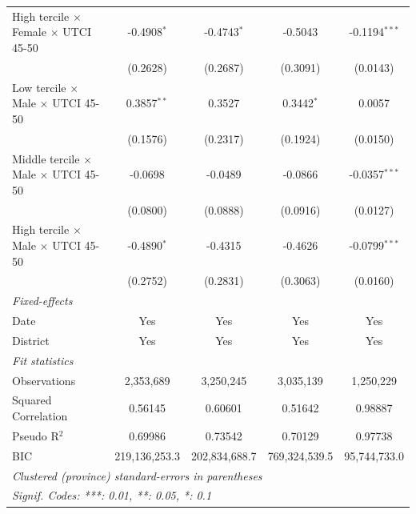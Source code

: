 \begin{table}[htbp]
\begin{tabular}{lcccc}
      High tercile $\times$ Female $\times$ UTCI 45-50     & -0.4908$^{*}$   & -0.4743$^{*}$       & -0.5043           & -0.1194$^{***}$\\   
                                                           & (0.2628)        & (0.2687)            & (0.3091)          & (0.0143)\\   
      Low tercile $\times$ Male $\times$ UTCI 45-50        & 0.3857$^{**}$   & 0.3527              & 0.3442$^{*}$      & 0.0057\\   
                                                           & (0.1576)        & (0.2317)            & (0.1924)          & (0.0150)\\   
      Middle tercile $\times$ Male $\times$ UTCI 45-50     & -0.0698         & -0.0489             & -0.0866           & -0.0357$^{***}$\\   
                                                           & (0.0800)        & (0.0888)            & (0.0916)          & (0.0127)\\   
      High tercile $\times$ Male $\times$ UTCI 45-50       & -0.4890$^{*}$   & -0.4315             & -0.4626           & -0.0799$^{***}$\\   
                                                           & (0.2752)        & (0.2831)            & (0.3063)          & (0.0160)\\   
      \midrule
      \emph{Fixed-effects}\\
      Date                                                 & Yes             & Yes                 & Yes               & Yes\\  
      District                                             & Yes             & Yes                 & Yes               & Yes\\  
      \midrule
      \emph{Fit statistics}\\
      Observations                                         & 2,353,689       & 3,250,245           & 3,035,139         & 1,250,229\\  
      Squared Correlation                                  & 0.56145         & 0.60601             & 0.51642           & 0.98887\\  
      Pseudo R$^2$                                         & 0.69986         & 0.73542             & 0.70129           & 0.97738\\  
      BIC                                                  & 219,136,253.3   & 202,834,688.7       & 769,324,539.5     & 95,744,733.0\\  
      \midrule \midrule
      \multicolumn{5}{l}{\emph{Clustered (province) standard-errors in parentheses}}\\
      \multicolumn{5}{l}{\emph{Signif. Codes: ***: 0.01, **: 0.05, *: 0.1}}\\
   \end{tabular}
\end{table}


